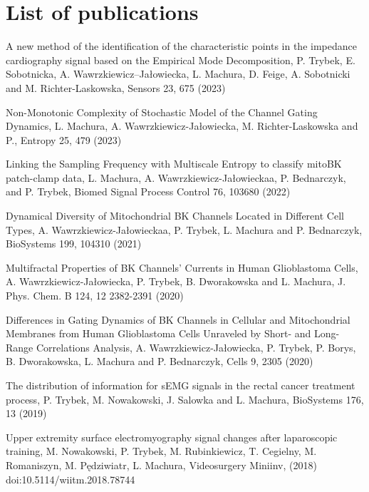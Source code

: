 \section{List of publications}
  \begin{etaremune}  %
  \item A new method of the identification of the characteristic points in the impedance cardiography signal based on the Empirical Mode Decomposition, P. Trybek, E. Sobotnicka, A. Wawrzkiewicz--Jałowiecka, L. Machura,  D. Feige, A. Sobotnicki and M. Richter-Laskowska, Sensors 23,  675 (2023)

\item Non-Monotonic Complexity of Stochastic Model of the Channel Gating Dynamics, L. Machura, A. Wawrzkiewicz-Jałowiecka, M. Richter-Laskowska and P., Entropy 25,  479 (2023)

\item Linking the Sampling Frequency with Multiscale Entropy to classify mitoBK patch-clamp data, L. Machura, A. Wawrzkiewicz-Jałowieckaa, P. Bednarczyk, and P. Trybek, Biomed Signal Process Control 76,  103680 (2022)

\item Dynamical Diversity of Mitochondrial BK Channels Located in Different Cell Types, A. Wawrzkiewicz-Jałowieckaa, P. Trybek, L. Machura and P. Bednarczyk, BioSystems 199,  104310 (2021) 

\item Multifractal Properties of BK Channels’ Currents in Human Glioblastoma Cells, A. Wawrzkiewicz-Jałowiecka, P. Trybek, B. Dworakowska and L. Machura, J. Phys. Chem. B 124,  12  2382-2391  (2020)

\item Differences in Gating Dynamics of BK Channels in Cellular and Mitochondrial Membranes from Human Glioblastoma Cells Unraveled by Short- and Long-Range Correlations Analysis, A. Wawrzkiewicz-Jałowiecka, P. Trybek, P. Borys, B. Dworakowska, L. Machura and P. Bednarczyk, Cells 9,  2305 (2020)

\item The distribution of information for sEMG signals in the rectal cancer treatment process, P. Trybek, M. Nowakowski, J. Salowka and L. Machura, BioSystems 176,  13 (2019)

\item Upper extremity surface electromyography signal changes after laparoscopic training, M. Nowakowski, P. Trybek, M. Rubinkiewicz, T. Cegielny, M. Romaniszyn, M. Pędziwiatr, L. Machura, Videosurgery Miniinv,  (2018)  doi:10.5114/wiitm.2018.78744


\end{etaremune}
